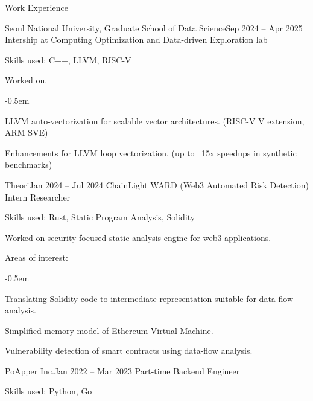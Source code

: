 \documentclass{resume}
\begin{document}
\begin{res-section}{Work Experience}
  \begin{res-subsection}{Seoul National University, Graduate School of Data Science}{Sep 2024 -- Apr 2025}
    Intership at Computing Optimization and Data-driven Exploration lab

    \item Skills used: C++, LLVM, RISC-V
    \item Worked on.
    \vspace{-0.5em}
    \begin{list}{--}{}
      \itemsep -0.5em
      \item LLVM auto-vectorization for scalable vector architectures. (RISC-V V extension, ARM SVE)
      \item Enhancements for LLVM loop vectorization. (up to ~15x speedups in synthetic benchmarks)
    \end{list}
  \end{res-subsection}

  \begin{res-subsection}{Theori}{Jan 2024 -- Jul 2024}
    ChainLight WARD (Web3 Automated Risk Detection) Intern Researcher

    \item Skills used: Rust, Static Program Analysis, Solidity

    \item Worked on security-focused static analysis engine for web3 applications.

    \item Areas of interest:
    \vspace{-0.5em}
    \begin{list}{--}{}
      \itemsep -0.5em
      \item Translating Solidity code to intermediate representation suitable for data-flow analysis.
      \item Simplified memory model of Ethereum Virtual Machine.
      \item Vulnerability detection of smart contracts using data-flow analysis.
    \end{list}
  \end{res-subsection}

  \begin{res-subsection}{PoApper Inc.}{Jan 2022 -- Mar 2023}
    Part-time Backend Engineer

    \item Skills used: Python, Go


\end{res-subsection}
\end{res-section}
\end{document}
